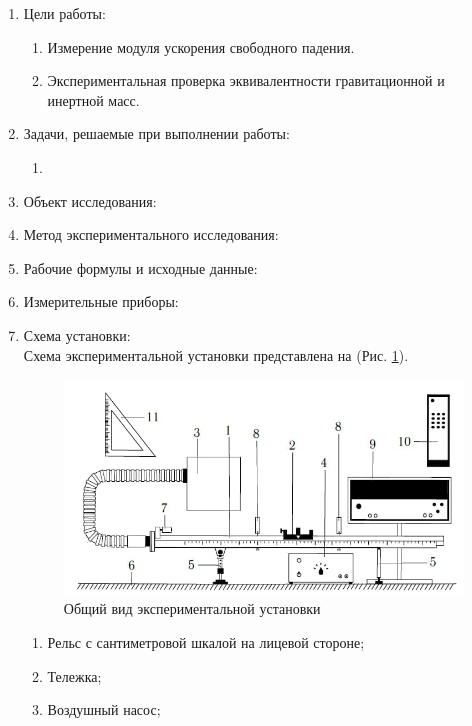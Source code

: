 \documentclass[12pt]{article}
\begin{document}
\begin{enumerate}
    \item Цели работы:
    \begin{enumerate}
        \item Измерение модуля ускорения свободного падения.
        \item Экспериментальная проверка эквивалентности гравитационной и инертной масс.
    \end{enumerate}

    \item Задачи, решаемые при выполнении работы:
    \begin{enumerate}
        \item 
    \end{enumerate}

    \item Объект исследования:
    \item Метод экспериментального исследования:
    \item Рабочие формулы и исходные данные:
    \item Измерительные приборы:
    \item Схема установки:\\
    Схема экспериментальной установки представлена на (Рис. \ref{pic:lab_set}).
    \begin{figure}[H]
        \centering
        \includegraphics[scale=0.9]{laboratory_setup.jpg}
        \caption{Общий вид экспериментальной установки}
        \label{pic:lab_set}
    \end{figure}
    \begin{enumerate}
        \item[1.] Рельс с сантиметровой шкалой на лицевой стороне;
        \item[2.] Тележка;
        \item[3.] Воздушный насос;

\end{enumerate}
\end{enumerate}
\end{document}

